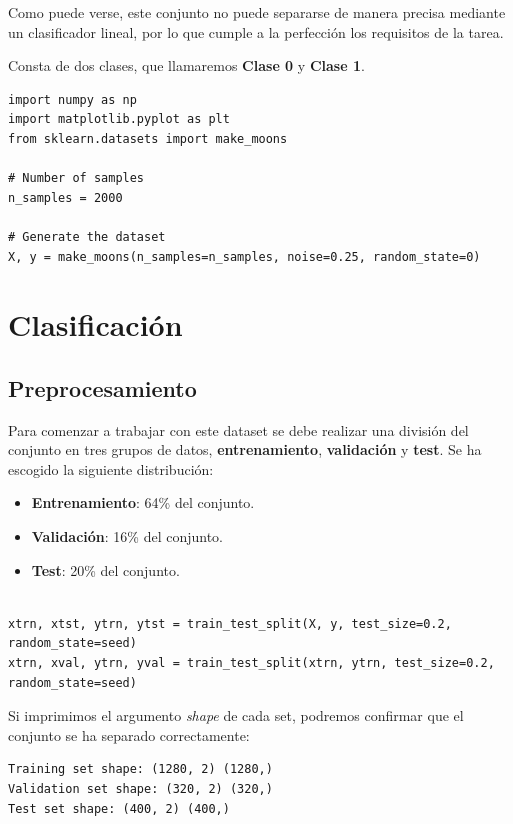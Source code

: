 \documentclass[paper=a4, fontsize=11pt]{scrartcl} %
\numberwithin{equation}{section} %
\numberwithin{figure}{section} %
\numberwithin{table}{section} %
\begin{document}
Como puede verse, este conjunto no puede separarse de manera precisa mediante un clasificador lineal, por lo que cumple a la perfección los requisitos de la tarea.

Consta de dos clases, que llamaremos \textbf{Clase 0} y \textbf{Clase 1}. 

\begin{verbatim}
import numpy as np
import matplotlib.pyplot as plt
from sklearn.datasets import make_moons

# Number of samples
n_samples = 2000

# Generate the dataset
X, y = make_moons(n_samples=n_samples, noise=0.25, random_state=0)
\end{verbatim}

\section{Clasificación}
\subsection{Preprocesamiento}

Para comenzar a trabajar con este dataset se debe realizar una división del conjunto en tres grupos de datos, \textbf{entrenamiento}, \textbf{validación} y \textbf{test}. Se ha escogido la siguiente distribución:

\begin{itemize}
    \item \textbf{Entrenamiento}: 64\% del conjunto.
    \item \textbf{Validación}: 16\% del conjunto.
    \item \textbf{Test}: 20\% del conjunto.
\end{itemize}

\begin{verbatim}
    
xtrn, xtst, ytrn, ytst = train_test_split(X, y, test_size=0.2, random_state=seed)
xtrn, xval, ytrn, yval = train_test_split(xtrn, ytrn, test_size=0.2, random_state=seed)
\end{verbatim}

Si imprimimos el argumento \textit{shape} de cada set, podremos confirmar que el conjunto se ha separado correctamente:

\begin{verbatim}
Training set shape: (1280, 2) (1280,)
Validation set shape: (320, 2) (320,)
Test set shape: (400, 2) (400,)

\end{verbatim}
\end{document}
